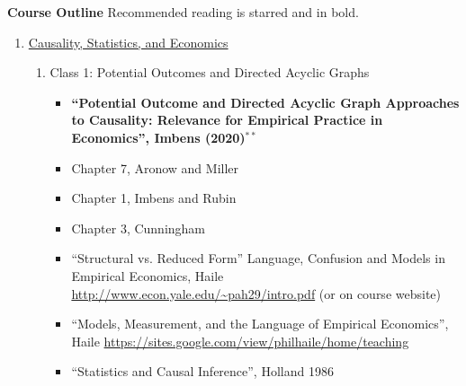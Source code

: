 \documentclass[11pt, a4paper]{article}
\begin{document}
\textbf{Course Outline}
Recommended reading is starred and in bold.
\begin{enumerate}
\item \underline{Causality, Statistics, and Economics}
  \begin{enumerate}
  \item Class 1: Potential Outcomes and Directed Acyclic Graphs
    \begin{itemize}
              \item \textbf{``Potential Outcome and Directed Acyclic Graph Approaches to Causality: Relevance for Empirical Practice in Economics'', Imbens (2020)}$^{**}$
    \item Chapter 7, Aronow and Miller
    \item Chapter 1, Imbens and Rubin
    \item Chapter 3, Cunningham
    \item ``Structural vs. Reduced Form'' Language, Confusion and Models in Empirical Economics, Haile \url{http://www.econ.yale.edu/~pah29/intro.pdf}  (or on course website)
    \item ``Models, Measurement, and the Language of Empirical Economics'', Haile \url{https://sites.google.com/view/philhaile/home/teaching
    }
    \item ``Statistics and Causal Inference'', Holland 1986


\end{itemize}
\end{enumerate}
\end{enumerate}
\end{document}
